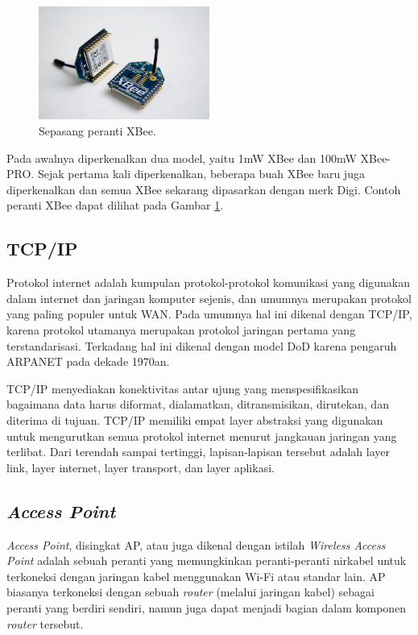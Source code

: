       \begin{figure}[ht!]
        \centering
          \includegraphics[width=0.5\textwidth]{gambar/xbee}
          \caption{Sepasang peranti XBee.}
          \label{xbee}
      \end{figure}

    Pada awalnya diperkenalkan dua model, yaitu 1mW XBee dan 100mW XBee-PRO. Sejak pertama kali diperkenalkan, beberapa buah XBee baru juga diperkenalkan dan semua XBee sekarang dipasarkan dengan merk Digi. Contoh peranti XBee dapat dilihat pada Gambar \ref{xbee}.

  \subsection{TCP/IP}
    Protokol internet adalah kumpulan protokol-protokol komunikasi yang digunakan dalam internet dan jaringan komputer sejenis, dan umumnya merupakan protokol yang paling populer untuk WAN. Pada umumnya hal ini dikenal dengan TCP/IP, karena protokol utamanya merupakan protokol jaringan pertama yang terstandarisasi. Terkadang hal ini dikenal dengan model DoD karena pengaruh ARPANET pada dekade 1970an.

    TCP/IP menyediakan konektivitas antar ujung yang menspesifikasikan bagaimana data harus diformat, dialamatkan, ditransmisikan, dirutekan, dan diterima di tujuan. TCP/IP memiliki empat layer abstraksi yang digunakan untuk mengurutkan semua protokol internet menurut jangkauan jaringan yang terlibat. Dari terendah sampai tertinggi, lapisan-lapisan tersebut adalah layer link, layer internet, layer transport, dan layer aplikasi.

  \subsection{\emph{Access Point}}
    \emph{Access Point}, disingkat AP, atau juga dikenal dengan istilah \emph{Wireless Access Point} adalah sebuah peranti yang memungkinkan peranti-peranti nirkabel untuk terkoneksi dengan jaringan kabel menggunakan Wi-Fi atau standar lain. AP biasanya terkoneksi dengan sebuah \emph{router} (melalui jaringan kabel) sebagai peranti yang berdiri sendiri, namun juga dapat menjadi bagian dalam komponen \emph{router} tersebut.

